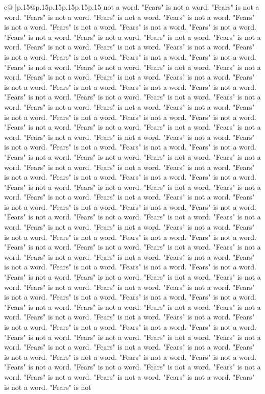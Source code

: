 \documentclass{article}
\begin{document}
{\begin{supertabular}{c@{$\;$}|p{.15\linewidth}@{}p{.15\linewidth}p{.15\linewidth}p{.15\linewidth}p{.15\linewidth}p{.15\linewidth}}
{{{not a word. "Fears" is not a word. "Fears" is not a word. "Fears" is not a word. "Fears" is not a word. "Fears" is not a word. "Fears" is not a word. "Fears" is not a word. "Fears" is not a word. "Fears" is not a word. "Fears" is not a word. "Fears" is not a word. "Fears" is not a word. "Fears" is not a word. "Fears" is not a word. "Fears" is not a word. "Fears" is not a word. "Fears" is not a word. "Fears" is not a word. "Fears" is not a word. "Fears" is not a word. "Fears" is not a word. "Fears" is not a word. "Fears" is not a word. "Fears" is not a word. "Fears" is not a word. "Fears" is not a word. "Fears" is not a word. "Fears" is not a word. "Fears" is not a word. "Fears" is not a word. "Fears" is not a word. "Fears" is not a word. "Fears" is not a word. "Fears" is not a word. "Fears" is not a word. "Fears" is not a word. "Fears" is not a word. "Fears" is not a word. "Fears" is not a word. "Fears" is not a word. "Fears" is not a word. "Fears" is not a word. "Fears" is not a word. "Fears" is not a word. "Fears" is not a word. "Fears" is not a word. "Fears" is not a word. "Fears" is not a word. "Fears" is not a word. "Fears" is not a word. "Fears" is not a word. "Fears" is not a word. "Fears" is not a word. "Fears" is not a word. "Fears" is not a word. "Fears" is not a word. "Fears" is not a word. "Fears" is not a word. "Fears" is not a word. "Fears" is not a word. "Fears" is not a word. "Fears" is not a word. "Fears" is not a word. "Fears" is not a word. "Fears" is not a word. "Fears" is not a word. "Fears" is not a word. "Fears" is not a word. "Fears" is not a word. "Fears" is not a word. "Fears" is not a word. "Fears" is not a word. "Fears" is not a word. "Fears" is not a word. "Fears" is not a word. "Fears" is not a word. "Fears" is not a word. "Fears" is not a word. "Fears" is not a word. "Fears" is not a word. "Fears" is not a word. "Fears" is not a word. "Fears" is not a word. "Fears" is not a word. "Fears" is not a word. "Fears" is not a word. "Fears" is not a word. "Fears" is not a word. "Fears" is not a word. "Fears" is not a word. "Fears" is not a word. "Fears" is not a word. "Fears" is not a word. "Fears" is not a word. "Fears" is not a word. "Fears" is not a word. "Fears" is not a word. "Fears" is not a word. "Fears" is not a word. "Fears" is not a word. "Fears" is not a word. "Fears" is not a word. "Fears" is not a word. "Fears" is not a word. "Fears" is not a word. "Fears" is not a word. "Fears" is not a word. "Fears" is not a word. "Fears" is not a word. "Fears" is not a word. "Fears" is not a word. "Fears" is not a word. "Fears" is not a word. "Fears" is not a word. "Fears" is not a word. "Fears" is not a word. "Fears" is not a word. "Fears" is not a word. "Fears" is not a word. "Fears" is not a word. "Fears" is not a word. "Fears" is not a word. "Fears" is not a word. "Fears" is not a word. "Fears" is not a word. "Fears" is not a word. "Fears" is not a word. "Fears" is not a word. "Fears" is not a word. "Fears" is not a word. "Fears" is not a word. "Fears" is not a word. "Fears" is not a word. "Fears" is not a word. "Fears" is not a word. "Fears" is not a word. "Fears" is not a word. "Fears" is not a word. "Fears" is not }}}
\end{supertabular}}
\end{document}
